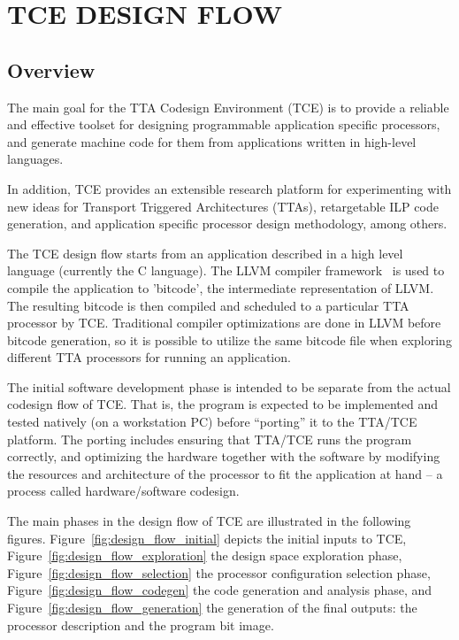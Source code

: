 \documentclass[twoside]{tceusermanual}
\begin{document}
\chapter{TCE DESIGN FLOW}
\label{chapter:tceFlow}

\section{Overview}

The main goal for the TTA Codesign Environment (TCE) is to provide a reliable
and effective toolset for designing programmable application specific
processors, and generate machine code for them from applications written 
in high-level languages.

In addition, TCE provides an extensible research platform for 
experimenting with new ideas for Transport Triggered Architectures (TTAs), 
retargetable ILP code generation, and application specific processor 
design methodology, among others.

The TCE design flow starts from an application described in a high level
language (currently the C language). The LLVM compiler framework~\cite{llvm-home-page} is used to
compile the application to 'bitcode', the intermediate representation of
LLVM. The resulting bitcode is then compiled and scheduled to a particular
TTA processor  by TCE. Traditional compiler optimizations are done in LLVM
before bitcode generation, so it is possible to utilize the same bitcode file
when exploring different TTA processors for running an application.

The initial software development phase is intended 
to be separate from the actual codesign flow of TCE. That is, the program is 
expected to be implemented and tested natively (on a workstation PC) before 
``porting'' it to the TTA/TCE platform. The porting includes ensuring
that TTA/TCE runs the program correctly, and optimizing the hardware together
with the software by modifying the resources and architecture of the processor
to fit  the application
at hand -- a process called hardware/software 
codesign.


The main phases in the design flow of TCE are illustrated in the following
figures. Figure~\ref{fig:design_flow_initial} depicts the initial
inputs to TCE, Figure~\ref{fig:design_flow_exploration} the design space 
exploration phase, Figure~\ref{fig:design_flow_selection} the processor 
configuration selection phase, Figure~\ref{fig:design_flow_codegen} the 
code generation and analysis phase, and Figure~\ref{fig:design_flow_generation} 
the generation of the final outputs: the processor description and the 
program bit image.
\end{document}
